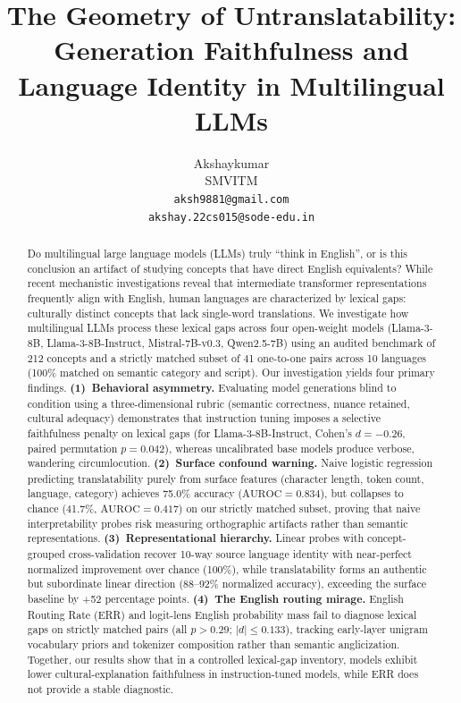 \documentclass{article}
\title{The Geometry of Untranslatability:\\
Generation Faithfulness and Language Identity in Multilingual LLMs}
\author{%
  Akshaykumar \\
  SMVITM \\
  \texttt{aksh9881@gmail.com} \\
  \texttt{akshay.22cs015@sode-edu.in}
}
\begin{document}
\maketitle

\begin{abstract}
Do multilingual large language models (LLMs) truly ``think in English'', or is this conclusion an artifact of studying concepts that have direct English equivalents? While recent mechanistic investigations reveal that intermediate transformer representations frequently align with English, human languages are characterized by lexical gaps: culturally distinct concepts that lack single-word translations. We investigate how multilingual LLMs process these lexical gaps across four open-weight models (Llama-3-8B, Llama-3-8B-Instruct, Mistral-7B-v0.3, Qwen2.5-7B) using an audited benchmark of 212 concepts and a strictly matched subset of 41 one-to-one pairs across 10 languages (100\% matched on semantic category and script).
Our investigation yields four primary findings.
\textbf{(1)~Behavioral asymmetry.} Evaluating model generations blind to condition using a three-dimensional rubric (semantic correctness, nuance retained, cultural adequacy) demonstrates that instruction tuning imposes a selective faithfulness penalty on lexical gaps (for Llama-3-8B-Instruct, Cohen's $d = -0.26$, paired permutation $p = 0.042$), whereas uncalibrated base models produce verbose, wandering circumlocution.
\textbf{(2)~Surface confound warning.} Naive logistic regression predicting translatability purely from surface features (character length, token count, language, category) achieves 75.0\% accuracy ($\text{AUROC} = 0.834$), but collapses to chance (41.7\%, $\text{AUROC} = 0.417$) on our strictly matched subset, proving that naive interpretability probes risk measuring orthographic artifacts rather than semantic representations.
\textbf{(3)~Representational hierarchy.} Linear probes with concept-grouped cross-validation recover 10-way source language identity with near-perfect normalized improvement over chance (100\%), while translatability forms an authentic but subordinate linear direction (88--92\% normalized accuracy), exceeding the surface baseline by +52 percentage points.
\textbf{(4)~The English routing mirage.} English Routing Rate (ERR) and logit-lens English probability mass fail to diagnose lexical gaps on strictly matched pairs (all $p > 0.29$; $|d| \le 0.133$), tracking early-layer unigram vocabulary priors and tokenizer composition rather than semantic anglicization.
Together, our results show that in a controlled lexical-gap inventory, models exhibit lower cultural-explanation faithfulness in instruction-tuned models, while ERR does not provide a stable diagnostic.
\end{abstract}
\end{document}
